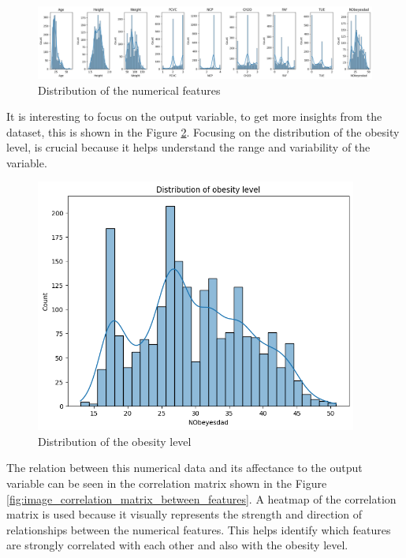 \documentclass[11pt, a4paper]{article}
\begin{document}
\begin{figure}[H]
    \centering
    \includegraphics[width=\textwidth]{images/distribution_numerical_features.png}
    \caption{Distribution of the numerical features}
    \label{fig:image_distribution_numerical_features}
\end{figure}

It is interesting to focus on the output variable, to get more insights from the dataset, this is shown in the Figure \ref{fig:image_distribution_obesity_level}.
Focusing on the distribution of the obesity level, is crucial because it helps understand the range and variability of the variable. 

\begin{figure}[H]
    \centering
    \includegraphics[width=300pt]{images/distribution_obesity_level.png}
    \caption{Distribution of the obesity level}
    \label{fig:image_distribution_obesity_level}
\end{figure}

The relation between this numerical data and its affectance to the output variable can be seen in the correlation matrix shown in the 
Figure \ref{fig:image_correlation_matrix_between_features}. A heatmap of the correlation matrix is used because it visually represents 
the strength and direction of relationships between the numerical features. This helps identify which features are strongly correlated 
with each other and also with the obesity level.
\end{document}
